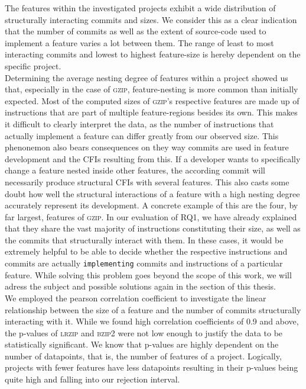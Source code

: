 The features within the investigated projects exhibit a wide distribution of structurally interacting commits and sizes.
We consider this as a clear indication that the number of commits as well as the extent of source-code used to implement a feature varies a lot between them.
The range of least to most interacting commits and lowest to highest feature-size is hereby dependent on the specific project. \\
Determining the average nesting degree of features within a project showed us that, especially in the case of \textsc{gzip}, feature-nesting is more common than initially expected.
Most of the computed sizes of \textsc{gzip}'s respective features are made up of instructions that are part of multiple feature-regions besides its own. 
This makes it difficult to clearly interpret the data, as the number of instructions that actually implement a feature can differ greatly from our observed size. 
This phenonemon also bears consequences on they way commits are used in feature development and the CFIs resulting from this. 
If a developer wants to specifically change a feature nested inside other features, the according commit will necessarily produce structural CFIs with several features.  
This also casts some doubt how well the structural interactions of a feature with a high nesting degree accurately represent its development.
A concrete example of this are the four, by far largest, features of \textsc{gzip}.
In our evaluation of RQ1, we have already explained that they share the vast majority of instructions constituting their size, as well as the commits that structurally interact with them.
In these cases, it would be extremely helpful to be able to decide whether the respective instructions and commits are actually \texttt{implementing} commits and instructions of a particular feature.
While solving this problem goes beyond the scope of this work, we will adress the subject and possible solutions again in the  section of this thesis. \\
We employed the pearson correlation coefficient to investigate the linear relationship between the size of a feature and the number of commits structurally interacting with it. 
While we found high correlation coefficients of 0.9 and above, the p-values of \textsc{lrzip} and \textsc{bzip2} were not low enough to justify the data to be statistically significant.  
We know that p-values are highly dependent on the number of datapoints, that is, the number of features of a project. 
Logically, projects with fewer features have less datapoints resulting in their p-values being quite high and falling into our rejection interval. 
